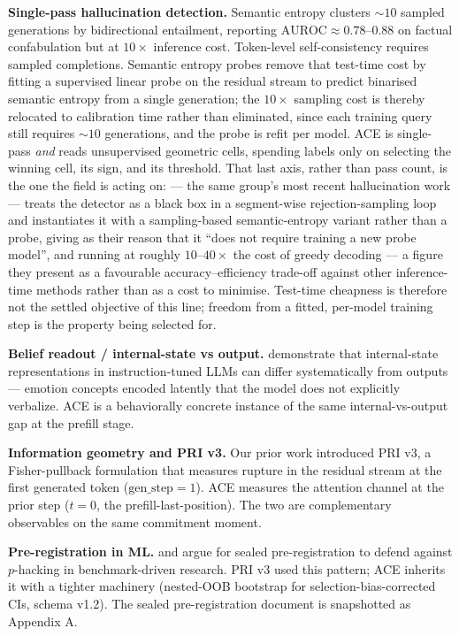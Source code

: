 \documentclass[10pt, letterpaper]{article}
\newcommand{\auroc}{\text{AUROC}}
\begin{document}
\textbf{Single-pass hallucination detection.} Semantic entropy
\citep{farquhar2024semantic} clusters $\sim 10$ sampled generations
by bidirectional entailment, reporting $\auroc \approx 0.78$--$0.88$
on factual confabulation but at $10\times$ inference cost. Token-level
self-consistency \citep{wastl2025token} requires sampled completions.
Semantic entropy probes \citep{kossen2024sep} remove that test-time
cost by fitting a supervised linear probe on the residual stream to
predict binarised semantic entropy from a single generation; the
$10\times$ sampling cost is thereby relocated to calibration time
rather than eliminated, since each training query still requires
$\sim 10$ generations, and the probe is refit per model. ACE is
single-pass \emph{and} reads unsupervised geometric cells, spending
labels only on selecting the winning cell, its sign, and its
threshold. That last axis, rather than pass count, is the one the
field is acting on: \citet{li2026shars} --- the same group's most
recent hallucination work --- treats the detector as a black box in a
segment-wise rejection-sampling loop and instantiates it with a
sampling-based semantic-entropy variant rather than a probe, giving as
their reason that it ``does not require training a new probe model'',
and running at roughly $10$--$40\times$ the cost of greedy decoding ---
a figure they present as a favourable accuracy--efficiency trade-off
against other inference-time methods rather than as a cost to minimise.
Test-time cheapness is therefore not the settled objective of this
line; freedom from a fitted, per-model training step is the property
being selected for.

\textbf{Belief readout / internal-state vs output.}
\citet{sofroniew2026emotions} demonstrate that internal-state
representations in instruction-tuned LLMs can differ systematically
from outputs --- emotion concepts encoded latently that the model does
not explicitly verbalize. ACE is a behaviorally concrete instance of
the same internal-vs-output gap at the prefill stage.

\textbf{Information geometry and PRI v3.} Our prior work
\citep{kitti2026pri} introduced PRI v3, a Fisher-pullback
formulation that measures rupture in the residual stream at the first
generated token ($\text{gen\_step}{=}1$). ACE measures the attention
channel at the prior step ($t{=}0$, the prefill-last-position). The
two are complementary observables on the same commitment moment.

\textbf{Pre-registration in ML.} \citet{nosek2018preregistration} and
\citet{pineau2021reproducibility} argue for sealed pre-registration to
defend against $p$-hacking in benchmark-driven research. PRI v3 used
this pattern; ACE inherits it with a tighter machinery (nested-OOB
bootstrap for selection-bias-corrected CIs, schema v1.2). The sealed
pre-registration document is snapshotted as Appendix A.
\end{document}
